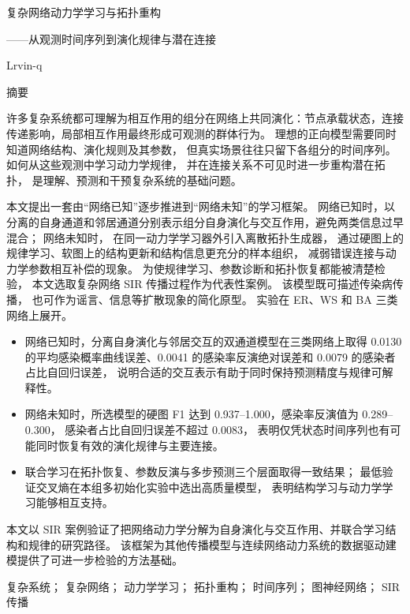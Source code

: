 \begingroup
\linespread{1.20}\selectfont
\begin{center}
  {\yahei{} 复杂网络动力学学习与拓扑重构\par}
  \vspace{0.45em}
  {\yahei{} ——从观测时间序列到演化规律与潜在连接\par}
  \vspace{1.4em}
  { Lrvin-q\par}
  \vspace{0.35em}
  { \paperdate\par}
\end{center}

\vspace{0.55em}
\begin{center}
  {\yahei{} 摘要}
\end{center}

许多复杂系统都可理解为相互作用的组分在网络上共同演化：节点承载状态，连接传递影响，局部相互作用最终形成可观测的群体行为。
理想的正向模型需要同时知道网络结构、演化规则及其参数，
但真实场景往往只留下各组分的时间序列。
如何从这些观测中学习动力学规律，
并在连接关系不可见时进一步重构潜在拓扑，
是理解、预测和干预复杂系统的基础问题。

本文提出一套由“网络已知”逐步推进到“网络未知”的学习框架。
网络已知时，以分离的自身通道和邻居通道分别表示组分自身演化与交互作用，避免两类信息过早混合；
网络未知时，
在同一动力学学习器外引入离散拓扑生成器，
通过硬图上的规律学习、软图上的结构更新和结构信息更充分的样本组织，
减弱错误连接与动力学参数相互补偿的现象。
为使规律学习、参数诊断和拓扑恢复都能被清楚检验，
本文选取复杂网络 SIR 传播过程作为代表性案例。
该模型既可描述传染病传播，
也可作为谣言、信息等扩散现象的简化原型。
实验在 ER、WS 和 BA 三类网络上展开。

\begin{itemize}[leftmargin=2.3em,itemsep=0.05em,topsep=0.2em]
  \item {\yahei 网络已知时，分离自身演化与邻居交互的双通道模型在三类网络上取得 0.0130 的平均感染概率曲线误差、0.0041 的感染率反演绝对误差和 0.0079 的感染者占比自回归误差，
说明合适的交互表示有助于同时保持预测精度与规律可解释性。}
  \item {\yahei 网络未知时，所选模型的硬图 F1 达到 0.937--1.000，感染率反演值为 0.289--0.300，
感染者占比自回归误差不超过 0.0083，
表明仅凭状态时间序列也有可能同时恢复有效的演化规律与主要连接。}
  \item {\yahei 联合学习在拓扑恢复、参数反演与多步预测三个层面取得一致结果；
最低验证交叉熵在本组多初始化实验中选出高质量模型，
表明结构学习与动力学学习能够相互支持。}
\end{itemize}

本文以 SIR 案例验证了把网络动力学分解为自身演化与交互作用、并联合学习结构和规律的研究路径。
该框架为其他传播模型与连续网络动力系统的数据驱动建模提供了可进一步检验的方法基础。

复杂系统；
复杂网络；
动力学学习；
拓扑重构；
时间序列；
图神经网络；
SIR 传播
\endgroup
